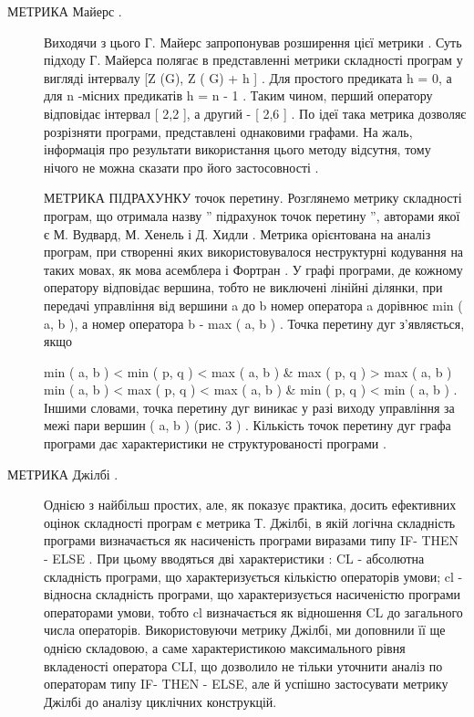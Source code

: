\begin{description}
\item[{МЕТРИКА Майерс .}] \leavevmode
Виходячи з цього Г. Майерс запропонував розширення цієї метрики . Суть підходу Г. Майерса полягає в представленні метрики складності програм у вигляді інтервалу {[}Z (G), Z ( G) + h {]} . Для простого предиката h = 0, а для n -місних предикатів h = n - 1 . Таким чином, перший оператору відповідає інтервал {[} 2,2 {]}, а другий - {[} 2,6 {]} .
По ідеї така метрика дозволяє розрізняти програми, представлені однаковими графами. На жаль, інформація про результати використання цього методу відсутня, тому нічого не можна сказати про його застосовності .

МЕТРИКА ПІДРАХУНКУ точок перетину.
Розглянемо метрику складності програм, що отримала назву '' підрахунок точок перетину '', авторами якої є М. Вудвард, М. Хенель і Д. Хидли . Метрика орієнтована на аналіз програм, при створенні яких використовувалося неструктурні кодування на таких мовах, як мова асемблера і Фортран .
У графі програми, де кожному оператору відповідає вершина, тобто не виключені лінійні ділянки, при передачі управління від вершини a до b номер оператора a дорівнює min ( a, b ), а номер оператора b - max ( a, b ) . Точка перетину дуг з'являється, якщо

min ( a, b ) \textless{} min ( p, q ) \textless{} max ( a, b ) \& max ( p, q ) \textgreater{} max ( a, b ) \textbar{}
min ( a, b ) \textless{} max ( p, q ) \textless{} max ( a, b ) \& min ( p, q ) \textless{} min ( a, b ) .
Іншими словами, точка перетину дуг виникає у разі виходу управління за межі пари вершин ( a, b ) (рис. 3 ) .
Кількість точок перетину дуг графа програми дає характеристики не структурованості програми .

\item[{МЕТРИКА Джілбі .}] \leavevmode
Однією з найбільш простих, але, як показує практика, досить ефективних оцінок складності програм є метрика Т. Джілбі, в якій логічна складність програми визначається як насиченість програми виразами типу IF- THEN - ELSE . При цьому вводяться дві характеристики : CL - абсолютна складність програми, що характеризується кількістю операторів умови; cl - відносна складність програми, що характеризується насиченістю програми операторами умови, тобто cl визначається як відношення CL до загального числа операторів.
Використовуючи метрику Джілбі, ми доповнили її ще однією складовою, а саме характеристикою максимального рівня вкладеності оператора CLI, що дозволило не тільки уточнити аналіз по операторам типу IF- THEN - ELSE, але й успішно застосувати метрику Джілбі до аналізу циклічних конструкцій.


\end{description}
